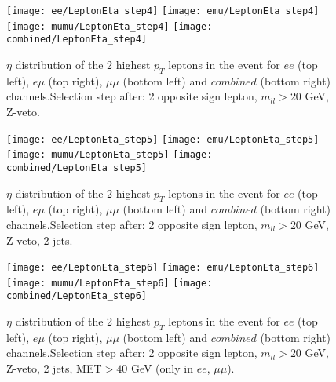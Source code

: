 \clearpage
\newpage


\begin{figure}
  \texttt{[image: ee/LeptonEta\_step4]}
  \texttt{[image: emu/LeptonEta\_step4]}\\
  \texttt{[image: mumu/LeptonEta\_step4]}
  \texttt{[image: combined/LeptonEta\_step4]}
\caption{$\eta$ distribution of the 2 highest $p_T$ leptons in the event for $ee$ (top left), $e\mu$ (top right), $\mu\mu$ (bottom left) and $combined$ (bottom right) channels.\newline Selection step after: 2 opposite sign lepton, $m_{ll}>20$ GeV, Z-veto.}
\end{figure}

\clearpage
\newpage


\begin{figure}
  \texttt{[image: ee/LeptonEta\_step5]}
  \texttt{[image: emu/LeptonEta\_step5]}\\
  \texttt{[image: mumu/LeptonEta\_step5]}
  \texttt{[image: combined/LeptonEta\_step5]}
\caption{$\eta$ distribution of the 2 highest $p_T$ leptons in the event for $ee$ (top left), $e\mu$ (top right), $\mu\mu$ (bottom left) and $combined$ (bottom right) channels.\newline Selection step after: 2 opposite sign lepton, $m_{ll}>20$ GeV, Z-veto, 2 jets.}
\end{figure}

\clearpage
\newpage


\begin{figure}
  \texttt{[image: ee/LeptonEta\_step6]}
  \texttt{[image: emu/LeptonEta\_step6]}\\
  \texttt{[image: mumu/LeptonEta\_step6]}
  \texttt{[image: combined/LeptonEta\_step6]}
\caption{$\eta$ distribution of the 2 highest $p_T$ leptons in the event for $ee$ (top left), $e\mu$ (top right), $\mu\mu$ (bottom left) and $combined$ (bottom right) channels.\newline Selection step after: 2 opposite sign lepton, $m_{ll}>20$ GeV, Z-veto, 2 jets, MET$>40$ GeV (only in $ee$, $\mu\mu$).}
\end{figure}

\clearpage
\newpage

